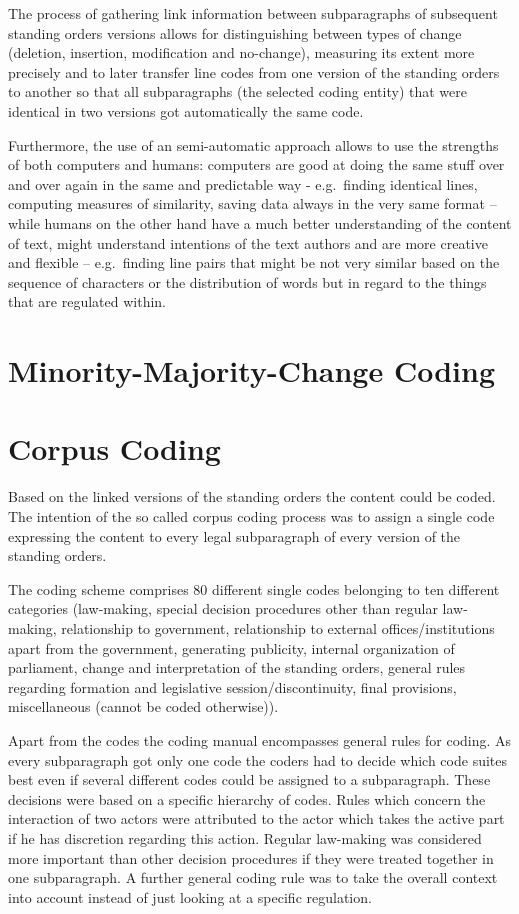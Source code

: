 \documentclass[]{article}
\begin{document}
The process of gathering link information between subparagraphs of
subsequent standing orders versions allows for distinguishing between
types of change (deletion, insertion, modification and no-change),
measuring its extent more precisely and to later transfer line codes
from one version of the standing orders to another so that all
subparagraphs (the selected coding entity) that were identical in two
versions got automatically the same code.

Furthermore, the use of an semi-automatic approach allows to use the
strengths of both computers and humans: computers are good at doing the
same stuff over and over again in the same and predictable way -
e.g.~finding identical lines, computing measures of similarity, saving
data always in the very same format -- while humans on the other hand
have a much better understanding of the content of text, might
understand intentions of the text authors and are more creative and
flexible -- e.g.~finding line pairs that might be not very similar based
on the sequence of characters or the distribution of words but in regard
to the things that are regulated within.

\section{Minority-Majority-Change
Coding}\label{minority-majority-change-coding}

\section{Corpus Coding}\label{corpus-coding}

Based on the linked versions of the standing orders the content could be
coded. The intention of the so called corpus coding process was to
assign a single code expressing the content to every legal subparagraph
of every version of the standing orders.

The coding scheme comprises 80 different single codes belonging to ten
different categories (law-making, special decision procedures other than
regular law-making, relationship to government, relationship to external
offices/institutions apart from the government, generating publicity,
internal organization of parliament, change and interpretation of the
standing orders, general rules regarding formation and legislative
session/discontinuity, final provisions, miscellaneous (cannot be coded
otherwise)).

Apart from the codes the coding manual encompasses general rules for
coding. As every subparagraph got only one code the coders had to decide
which code suites best even if several different codes could be assigned
to a subparagraph. These decisions were based on a specific hierarchy of
codes. Rules which concern the interaction of two actors were attributed
to the actor which takes the active part if he has discretion regarding
this action. Regular law-making was considered more important than other
decision procedures if they were treated together in one subparagraph. A
further general coding rule was to take the overall context into account
instead of just looking at a specific regulation.
\end{document}
